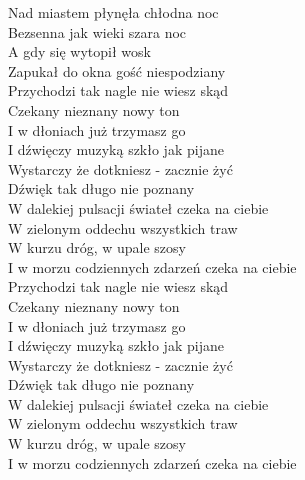 
Nad miastem płynęła chłodna noc \\
Bezsenna jak wieki szara noc \\
A gdy się wytopił wosk \\
Zapukał do okna gość niespodziany \\
\hops
{} Przychodzi tak nagle nie wiesz skąd \\
 Czekany nieznany nowy ton \\
 I w dłoniach już trzymasz go \\
 I dźwięczy muzyką szkło jak pijane \\
\hops
{} {} Wystarczy że dotkniesz - zacznie żyć \\
 {} Dźwięk tak długo nie poznany \\
 {} W dalekiej pulsacji świateł czeka na ciebie \\
\hops
{} {} W zielonym oddechu wszystkich traw \\
 {} W kurzu dróg, w upale szosy \\
 {} I w morzu codziennych zdarzeń czeka na ciebie \\
\hops
{} Przychodzi tak nagle nie wiesz skąd \\
 Czekany nieznany nowy ton \\
 I w dłoniach już trzymasz go \\
 I dźwięczy muzyką szkło jak pijane \\
\hops
{} {} Wystarczy że dotkniesz - zacznie żyć \\
 {} Dźwięk tak długo nie poznany \\
 {} W dalekiej pulsacji świateł czeka na ciebie \\
\hops
{} {} W zielonym oddechu wszystkich traw \\
 {} W kurzu dróg, w upale szosy \\
 {} I w morzu codziennych zdarzeń czeka na ciebie
